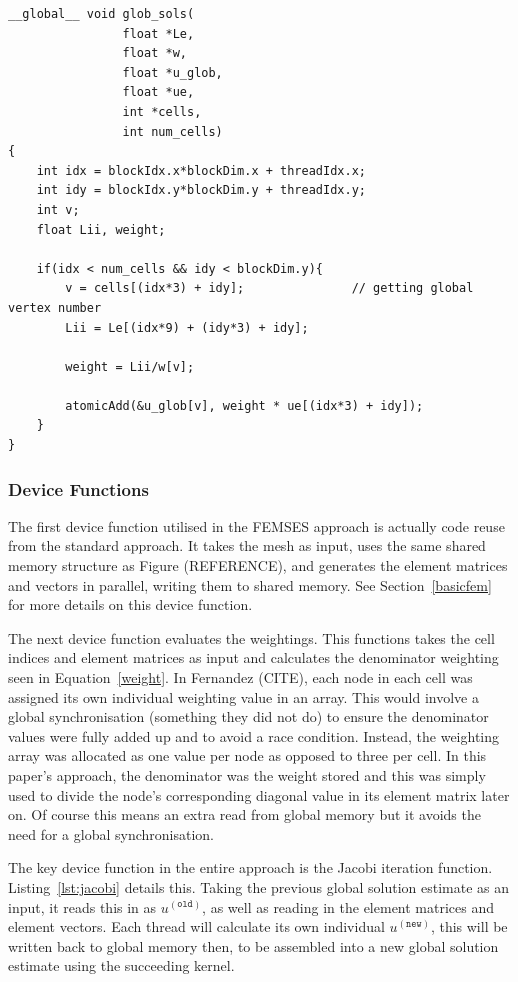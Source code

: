 \begin{lstlisting}[style=cppStyle, caption={Kernel to assemble global solution vector in FEMSES from local solution estimates using weighting.}, label={lst:global}]
__global__ void glob_sols(
                float *Le, 
                float *w, 
                float *u_glob, 
                float *ue, 
                int *cells,
                int num_cells)
{
    int idx = blockIdx.x*blockDim.x + threadIdx.x;
    int idy = blockIdx.y*blockDim.y + threadIdx.y;
    int v;
    float Lii, weight;

    if(idx < num_cells && idy < blockDim.y){
        v = cells[(idx*3) + idy];               // getting global vertex number
        Lii = Le[(idx*9) + (idy*3) + idy];      
        
        weight = Lii/w[v];
        
        atomicAdd(&u_glob[v], weight * ue[(idx*3) + idy]);
    }
}
\end{lstlisting}
\subsubsection{Device Functions}

The first device function utilised in the FEMSES approach is actually code reuse from the standard approach. It takes the mesh as input, uses the same shared memory structure as Figure (REFERENCE), and generates the element matrices and vectors in parallel, writing them to shared memory. See Section~\ref{basicfem} for more details on this device function.

The next device function evaluates the weightings. This functions takes the cell indices and element matrices as input and calculates the denominator weighting seen in Equation~\eqref{weight}. In Fernandez (CITE), each node in each cell was assigned its own individual weighting value in an array. This would involve a global synchronisation (something they did not do) to ensure the denominator values were fully added up and to avoid a race condition. Instead, the weighting array was allocated as one value per node as opposed to three per cell. In this paper's approach, the denominator was the weight stored and this was simply used to divide the node's corresponding diagonal value in its element matrix later on. Of course this means an extra read from global memory but it avoids the need for a global synchronisation.

The key device function in the entire approach is the Jacobi iteration function. Listing~\ref{lst:jacobi} details this. Taking the previous global solution estimate as an input, it reads this in as $u^{(\texttt{old})}$, as well as reading in the element matrices and element vectors. Each thread will calculate its own individual $u^{(\texttt{new})}$, this will be written back to global memory then, to be assembled into a new global solution estimate using the succeeding kernel.

